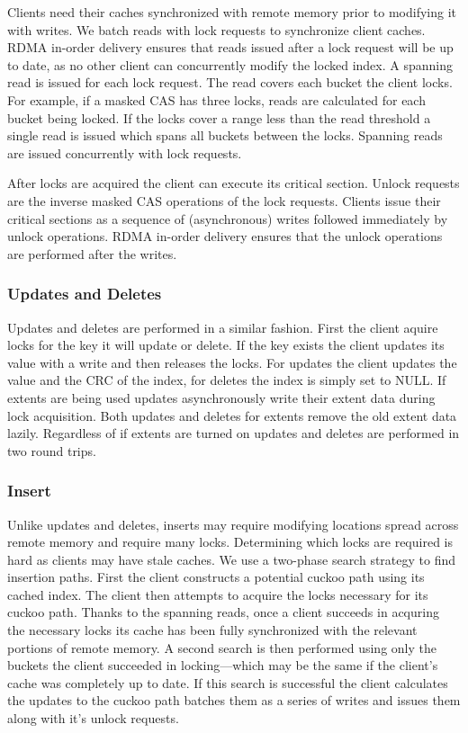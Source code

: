 Clients need their caches synchronized with remote memory
prior to modifying it with writes. We batch reads with lock
requests to synchronize client caches. RDMA in-order
delivery ensures that reads issued after a lock request will
be up to date, as no other client can concurrently modify
the locked index.  A spanning read is issued for each lock
request. The read covers each bucket the client locks.  For example, if a
masked CAS has three locks, reads are calculated for each
bucket being locked. If the locks cover a range less than
the read threshold a single read is issued which spans all
buckets between the locks.  Spanning reads are issued concurrently with
lock requests.

After locks are acquired the client can execute its critical
section. Unlock requests are the inverse masked CAS operations of the
lock requests. Clients issue their critical sections as a sequence of
(asynchronous) writes followed immediately by unlock operations. RDMA
in-order delivery ensures that the unlock operations are performed
after the writes.

\subsubsection{Updates and Deletes}

Updates and deletes are performed in a similar fashion.
First the client aquire locks for the key it will update or
delete. If the key exists the client updates its value with
a write and then releases the locks. For updates the client
updates the value and the CRC of the index, for deletes the
index is simply set to NULL. If extents are being used
updates asynchronously write their extent data during lock
acquisition. Both updates and deletes for extents remove the
old extent data lazily. Regardless of if extents are turned
on updates and deletes are performed in two round trips.

\subsubsection{Insert}

Unlike updates and deletes, inserts may require modifying locations spread across remote memory and
require many locks. Determining which locks are required is
hard as clients may have stale caches. We use a two-phase
search strategy to find insertion paths. First the client
constructs a potential cuckoo path using its cached index. The client
then attempts to acquire the locks necessary for its cuckoo path. Thanks to the spanning reads, once a client succeeds in acquring the necessary locks its
cache has been fully synchronized with the relevant portions of remote memory. A second
search is then performed using only the buckets the client
succeeded in locking---which may be the same if the client's cache was completely up to date. If this search is successful the client
calculates the updates to the cuckoo path batches them as a
series of writes and issues them along with it's unlock
requests.

